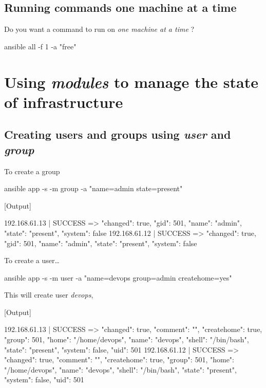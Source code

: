 \subsection{Running commands one machine at a time}

Do you want a command to run on \emph{one machine at a time} ?

\begin{code}
ansible all -f 1 -a "free"
\end{code}

\section{Using \emph{modules} to manage the state of infrastructure}

\subsection{Creating users and groups using \emph{user} and \emph{group}}

To create a group

\begin{code}
ansible app -s -m group -a "name=admin state=present"
\end{code}

[Output]\newline
\begin{code}
192.168.61.13 | SUCCESS => {
    "changed": true,
    "gid": 501,
    "name": "admin",
    "state": "present",
    "system": false
}
192.168.61.12 | SUCCESS => {
    "changed": true,
    "gid": 501,
    "name": "admin",
    "state": "present",
    "system": false
}
\end{code}

To create a user\ldots{}

\begin{code}
ansible app -s -m user -a "name=devops group=admin createhome=yes"
\end{code}

This will create user \emph{devops},

[Output]\newline
\begin{code}
192.168.61.13 | SUCCESS => {
    "changed": true,
    "comment": "",
    "createhome": true,
    "group": 501,
    "home": "/home/devops",
    "name": "devops",
    "shell": "/bin/bash",
    "state": "present",
    "system": false,
    "uid": 501
}
192.168.61.12 | SUCCESS => {
    "changed": true,
    "comment": "",
    "createhome": true,
    "group": 501,
    "home": "/home/devops",
    "name": "devops",
    "shell": "/bin/bash",
    "state": "present",
    "system": false,
    "uid": 501
}
\end{code}


